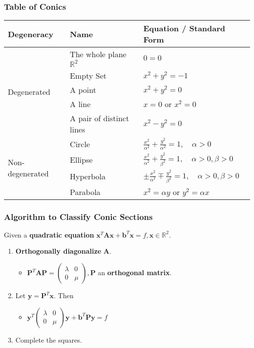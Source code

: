\documentclass[../ma2001_notes.tex]{subfiles}
\begin{document}
\subsubsection{Table of Conics}
\begin{center}
\begin{tabular}{|m{3cm}|m{4cm}|m{6cm}|}
\hline
Degeneracy & Name & Equation / Standard Form \\
\hline
\multirow{5}{*}{Degenerated} & The whole plane \(\mathbb{R}^2\) & \(0=0\) \\
\cline{2-3}
& Empty Set & \(x^2+y^2=-1\) \\
\cline{2-3}
& A point & \(x^2+y^2=0\) \\
\cline{2-3}
& A line & \(x=0\) or \(x^2=0\) \\
\cline{2-3}
& A pair of distinct lines & \(x^2-y^2=0\) \\
\hline
\multirow{4}{*}{Non-degenerated} & Circle & \parbox[top][1.2cm][c]{6cm}{\(\displaystyle\frac{x^2}{\alpha^2}+\frac{y^2}{\alpha^2}=1,\quad\alpha>0\)} \\
& Ellipse & \parbox[top][1.2cm][c]{6cm}{\(\displaystyle\frac{x^2}{\alpha^2}+\frac{y^2}{\beta^2}=1,\quad\alpha>0,\beta>0\)} \\
& Hyperbola & \parbox[top][1.2cm][c]{6cm}{\(\displaystyle\pm\frac{x^2}{\alpha^2}\mp\frac{y^2}{\beta^2}=1,\quad\alpha>0,\beta>0\)} \\
& Parabola & \(x^2=\alpha y\) or \(y^2=\alpha x\) \\
\hline
\end{tabular}
\end{center}

\subsubsection{Algorithm to Classify Conic Sections}
Given a \textbf{quadratic equation} \(\bm{x}^T\bm{Ax}+\bm{b}^T\bm{x}=f,\bm{x}\in\mathbb{R}^2\).
\begin{enumerate}
	\item\textbf{Orthogonally diagonalize} \(\bm{A}\).
	\begin{itemize}
		\item\(\bm{P}^T\bm{AP}=\begin{pmatrix}
			\lambda & 0 \\ 0 & \mu
		\end{pmatrix},\bm{P}\) an \textbf{orthogonal matrix}.
	\end{itemize}
	\item Let \(\bm{y}=\bm{P}^T\bm{x}\). Then
	\begin{itemize}
		\item\(\bm{y}^T\begin{pmatrix}
			\lambda & 0 \\ 0 & \mu
		\end{pmatrix}\bm{y}+\bm{b}^T\bm{Py}=f\)
	\end{itemize}
	\item Complete the squares.
\end{enumerate}
\end{document}
